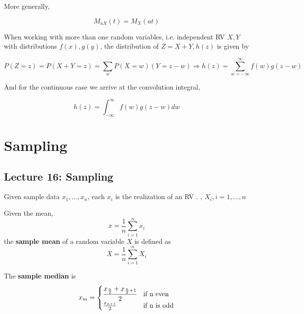 \documentclass[10pt]{article}
\begin{document}
More generally,

\begin{equation}
	M_{aX}(t) = M_X(at)
	\label{eq:286:lin_comb_mgf_general}
\end{equation}


When working with more than one random variables, i.e. independent RV $ X, Y $  with distributions $ f(x), g(y) $, the distribution of $ Z = X + Y, h(z) $  is given by


\begin{equation}
	P(Z = z) = P(X+Y = z) = \sum_w P(X = w) (Y = z-w) \Rightarrow h(z) = \sum^\infty_{w = -\infty} f(w) g(z-w)
	\label{eq:286:lin_comb_conv_discrete}
\end{equation}

And for the continuous case we arrive at the convolution integral,

\begin{equation}
	h(z) = \int_{-\infty}^{\infty}  f(w) g(z-w) dw
\end{equation}












\section{Sampling}


\subsection{Lecture 16: Sampling}


Given sample data $ x_1, \ldots, x_n $, each $ x_i $ is the realization of an RV . , $ X_i, i = 1, \ldots, n$ 


\begin{definition}
	Given the mean,
	\begin{equation}
		\overline{x} = \frac{1}{n} \sum^n_{i=1} x_i
	\end{equation}
	the \textbf{sample mean} of a random variable $ X $ is defined as 
	\begin{equation}
		\overline{X} = \frac{1}{n} \sum^n_{i=1} X_i
		\label{eq:286:sample_mean_dfn}
	\end{equation}
\end{definition}


\begin{definition}
	The \textbf{sample median} is
	\begin{equation}
		x_m = \begin{cases}
			\cfrac{x_{\frac{n}{2}} + x_{\frac{n}{2} + 1}}{2} & \text{if n even} \\
			\frac{x_{n+1}}{2} & \text{if n is odd} \\
		\end{cases}
		\label{eq:286:sample_median_dfn}
	\end{equation}
\end{definition}
\end{document}
